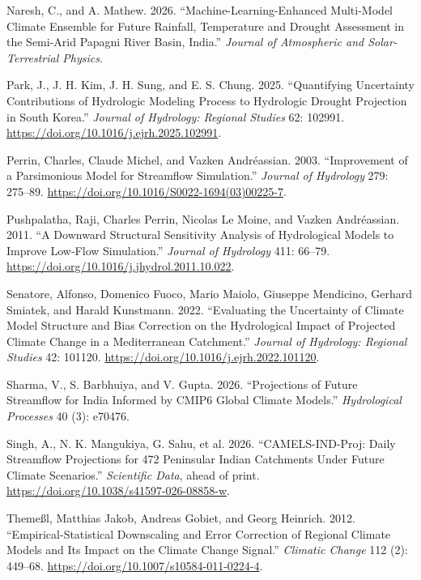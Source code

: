 \documentclass[
  english,
  11pt,
]{article}
\newlength{\cslhangindent}
\newenvironment{CSLReferences}[2] %
 {\begin{list}{}{%
  \setlength{\itemindent}{0pt}
  \setlength{\leftmargin}{0pt}
  \setlength{\parsep}{0pt}
  \ifodd #1
   \setlength{\leftmargin}{\cslhangindent}
   \setlength{\itemindent}{-1\cslhangindent}
  \fi
  \setlength{\itemsep}{#2\baselineskip}}}
 {\end{list}}
\begin{document}
\begin{CSLReferences}{1}{1}
Naresh, C., and A. Mathew. 2026. {``Machine-Learning-Enhanced
Multi-Model Climate Ensemble for Future Rainfall, Temperature and
Drought Assessment in the Semi-Arid {Papagni River} Basin, {India}.''}
\emph{Journal of Atmospheric and Solar-Terrestrial Physics}.

Park, J., J. H. Kim, J. H. Sung, and E. S. Chung. 2025. {``Quantifying
Uncertainty Contributions of Hydrologic Modeling Process to Hydrologic
Drought Projection in {South Korea}.''} \emph{Journal of Hydrology:
Regional Studies} 62: 102991.
\url{https://doi.org/10.1016/j.ejrh.2025.102991}.

Perrin, Charles, Claude Michel, and Vazken Andréassian. 2003.
{``Improvement of a Parsimonious Model for Streamflow Simulation.''}
\emph{Journal of Hydrology} 279: 275--89.
\url{https://doi.org/10.1016/S0022-1694(03)00225-7}.

Pushpalatha, Raji, Charles Perrin, Nicolas Le Moine, and Vazken
Andréassian. 2011. {``A Downward Structural Sensitivity Analysis of
Hydrological Models to Improve Low-Flow Simulation.''} \emph{Journal of
Hydrology} 411: 66--79.
\url{https://doi.org/10.1016/j.jhydrol.2011.10.022}.

Senatore, Alfonso, Domenico Fuoco, Mario Maiolo, Giuseppe Mendicino,
Gerhard Smiatek, and Harald Kunstmann. 2022. {``Evaluating the
Uncertainty of Climate Model Structure and Bias Correction on the
Hydrological Impact of Projected Climate Change in a {Mediterranean}
Catchment.''} \emph{Journal of Hydrology: Regional Studies} 42: 101120.
\url{https://doi.org/10.1016/j.ejrh.2022.101120}.

Sharma, V., S. Barbhuiya, and V. Gupta. 2026. {``Projections of Future
Streamflow for {India} Informed by {CMIP6} Global Climate Models.''}
\emph{Hydrological Processes} 40 (3): e70476.

{Singh, A., N. K. Mangukiya, G. Sahu, et al.} 2026.
{``{CAMELS-IND-Proj}: Daily Streamflow Projections for 472 {Peninsular
Indian} Catchments Under Future Climate Scenarios.''} \emph{Scientific
Data}, ahead of print. \url{https://doi.org/10.1038/s41597-026-08858-w}.

Themeßl, Matthias Jakob, Andreas Gobiet, and Georg Heinrich. 2012.
{``Empirical-Statistical Downscaling and Error Correction of Regional
Climate Models and Its Impact on the Climate Change Signal.''}
\emph{Climatic Change} 112 (2): 449--68.
\url{https://doi.org/10.1007/s10584-011-0224-4}.

\end{CSLReferences}
\end{document}
